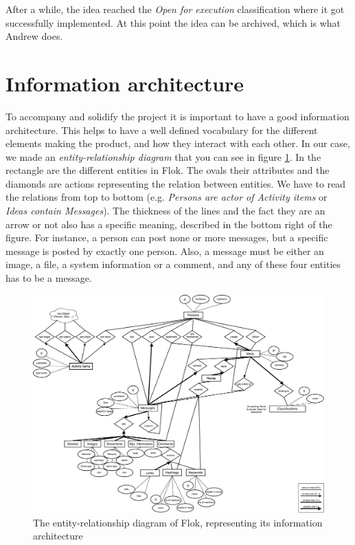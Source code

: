 \documentclass[a4paper,12pt, oneside]{article}
\begin{document}
After a while, the idea reached the \emph{Open for execution} classification where it got successfully implemented.
At this point the idea can be archived, which is what Andrew does.


\section{Information architecture}
To accompany and solidify the project it is important to have a good information architecture.
This helps to have a well defined vocabulary for the different elements making the product, and how they interact with each other.
In our case, we made an \emph{entity-relationship diagram} that you can see in figure \ref{fig.erDiagram}.
In the rectangle are the different entities in Flok.
The ovals their attributes and the diamonds are actions representing the relation between entities.
We have to read the relations from top to bottom (e.g. \emph{Persons are actor of Activity items} or \emph{Ideas contain Messages}).
The thickness of the lines and the fact they are an arrow or not also has a specific meaning, described in the bottom right of the figure.
For instance, a person can post none or more messages, but a specific message is posted by exactly one person.
Also, a message must be either an image, a file, a system information or a comment, and any of these four entities has to be a message.

\begin{figure}
\centering
\includegraphics[width=\textwidth]{images/erDiagram.pdf}
\caption{The entity-relationship diagram of Flok, representing its information architecture}
\label{fig.erDiagram}
\end{figure}
\end{document}
